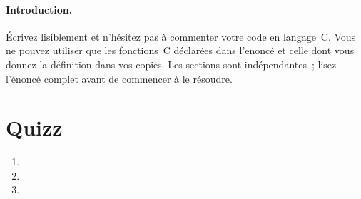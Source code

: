 \documentclass[ds]{sujet}
\begin{document}
\formation{} 
\matiere{}  
\auteur{} 
\def\SujetClsNumero{}
\paragraph{Introduction.}
\'Ecrivez lisiblement et n'h\'esitez pas \`a commenter votre code en
langage~C. 
Vous ne pouvez utiliser que les fonctions~C  d\'eclar\'ees
dans l'enonc\'e et celle dont vous donnez la d\'efinition dans vos copies.
Les sections sont ind\'ependantes~; lisez l'\'enonc\'e
complet avant de commencer \`a le r\'esoudre.
\section{Quizz}
\begin{enumerate}
\item
\item
\item
\end{enumerate}


\end{document}
